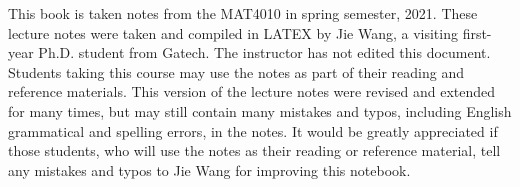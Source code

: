 
\usepackage{pdfpages}


\frontmatter
%


\subtitle{MAT4010 Notebook}



\halftitlepage
\titlepage

\tableofcontents






\acknowledgments
This book is taken notes from the MAT4010 in spring semester, 2021. These lecture notes
were taken and compiled in LATEX by Jie Wang, a visiting first-year Ph.D. student from Gatech.
The instructor has not edited this document. Students taking this course may use
the notes as part of their reading and reference materials. This version of the lecture
notes were revised and extended for many times, but may still contain many mistakes
and typos, including English grammatical and spelling errors, in the notes. It would
be greatly appreciated if those students, who will use the notes as their reading or
reference material, tell any mistakes and typos to Jie Wang for improving this notebook.


